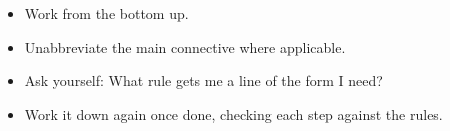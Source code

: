 \documentclass[../../../include/open-logic-section]{subfiles}
\begin{document}

\begin{itemize}
	\item Work from the bottom up.
	\item Unabbreviate the main connective where applicable.
	\item Ask yourself: What rule gets me a line of the form I need?
	\item Work it down again once done, checking each step against the rules.
\end{itemize}
\end{document}
